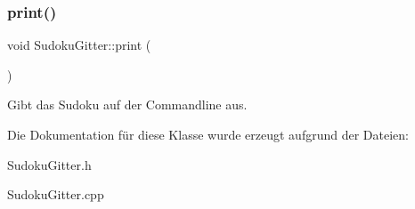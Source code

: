 \subsubsection{\texorpdfstring{print()}{print()}}
{\footnotesize\ttfamily void Sudoku\+Gitter\+::print (\begin{DoxyParamCaption}{ }\end{DoxyParamCaption})}

Gibt das Sudoku auf der Commandline aus. 

Die Dokumentation für diese Klasse wurde erzeugt aufgrund der Dateien\+:\begin{DoxyCompactItemize}
\item 
Sudoku\+Gitter.\+h\item 
Sudoku\+Gitter.\+cpp\end{DoxyCompactItemize}
